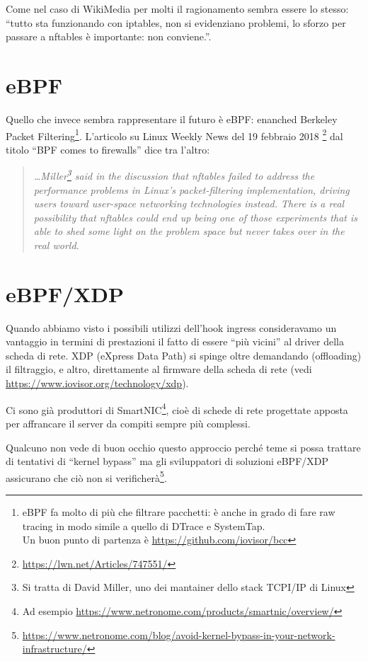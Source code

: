 Come nel caso di WikiMedia per molti il ragionamento sembra essere lo stesso: ``tutto sta
funzionando con iptables, non si evidenziano problemi, lo sforzo per passare a
nftables \`e importante: non conviene.''.

\section{eBPF}

Quello che invece sembra rappresentare il futuro \`e eBPF:
enanched Berkeley Packet Filtering\footnote{eBPF fa molto di pi\`u che filtrare
pacchetti: \`e anche in grado di fare raw tracing in modo simile a quello di
DTrace e SystemTap.\\Un buon punto di partenza \`e
\url{https://github.com/iovisor/bcc}}.
L'articolo su Linux Weekly News del 19 febbraio 2018
\footnote{\url{https://lwn.net/Articles/747551/}} dal titolo ``BPF comes to firewalls''
dice tra l'altro:

\begin{quote}
    {\em \ldots Miller\footnote{Si tratta di David Miller, uno dei mantainer dello stack
TCPI/IP di Linux} said in the discussion that nftables failed to address the
performance problems in Linux's packet-filtering implementation, driving users
toward user-space networking technologies instead. There is a real possibility
that nftables could end up being one of those experiments that is able to shed
some light on the problem space but never takes over in the real world.}
\end{quote}


\section{eBPF/XDP}
Quando abbiamo visto i possibili utilizzi dell'hook ingress consideravamo
un vantaggio in termini di prestazioni il fatto di essere ``pi\`u vicini'' al
driver della scheda di rete. XDP (eXpress Data Path) si spinge oltre
demandando (offloading) il filtraggio, e altro, direttamente al firmware della scheda di
rete (vedi \url{https://www.iovisor.org/technology/xdp}).

Ci sono gi\`a produttori di SmartNIC\footnote{Ad esempio
    \url{https://www.netronome.com/products/smartnic/overview/}}, cio\`e di
    schede di rete progettate apposta per affrancare il server 
    da compiti sempre pi\`u complessi.
    
    Qualcuno
    non vede di buon occhio questo approccio perch\'e teme si possa trattare di tentativi di
    ``kernel
    bypass'' ma gli sviluppatori di soluzioni eBPF/XDP assicurano che ci\`o
    non si
    verificher\`a\footnote{\url{https://www.netronome.com/blog/avoid-kernel-bypass-in-your-network-infrastructure/}}.

